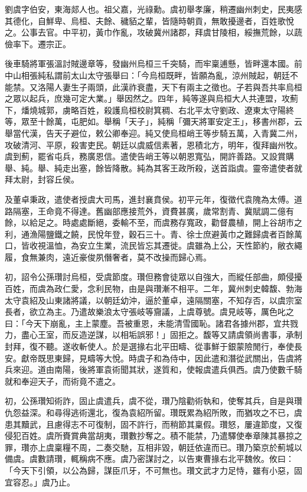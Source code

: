 
\begin{pinyinscope}
劉虞字伯安，東海郯人也。祖父嘉，光祿勳。虞初舉孝廉，稍遷幽州刺史，民夷感其德化，自鮮卑、烏桓、夫餘、穢貊之輩，皆隨時朝貢，無敢擾邊者，百姓歌悅之。公事去官。中平初，黃巾作亂，攻破冀州諸郡，拜虞甘陵相，綏撫荒餘，以蔬儉率下。遷宗正。

後車騎將軍張溫討賊邊章等，發幽州烏桓三千突騎，而牢稟逋懸，皆畔還本國。前中山相張純私謂前太山太守張舉曰：「今烏桓既畔，皆願為亂，涼州賊起，朝廷不能禁。又洛陽人妻生子兩頭，此漢祚衰盡，天下有兩主之徵也。子若與吾共率烏桓之眾以起兵，庶幾可定大業。」舉因然之。四年，純等遂與烏桓大人共連盟，攻薊下，燔燒城郭，虜略百姓，殺護烏桓校尉箕稠、右北平太守劉政、遼東太守陽終等，眾至十餘萬，屯肥如。舉稱「天子」，純稱「彌天將軍安定王」，移書州郡，云舉當代漢，告天子避位，敕公卿奉迎。純又使烏桓峭王等步騎五萬，入青冀二州，攻破清河、平原，殺害吏民。朝廷以虞威信素著，恩積北方，明年，復拜幽州牧。虞到薊，罷省屯兵，務廣恩信。遣使告峭王等以朝恩寬弘，開許善路。又設賞購舉、純。舉、純走出塞，餘皆降散。純為其客王政所殺，送首詣虞。靈帝遣使者就拜太尉，封容丘侯。

及董卓秉政，遣使者授虞大司馬，進封襄賁侯。初平元年，復徵代袁隗為太傅。道路隔塞，王命竟不得達。舊幽部應接荒外，資費甚廣，歲常割青、冀賦調二億有餘，以給足之。時處處斷絕，委輸不至，而虞務存寬政，勸督農植，開上谷胡巿之利，通漁陽鹽鐵之饒，民悅年登，穀石三十。青、徐士庶避黃巾之難歸虞者百餘萬口，皆收視溫恤，為安立生業，流民皆忘其遷徙。虞雖為上公，天性節約，敝衣繩履，食無兼肉，遠近豪俊夙僭奢者，莫不改操而歸心焉。

初，詔令公孫瓚討烏桓，受虞節度。瓚但務會徒眾以自強大，而縱任部曲，頗侵擾百姓，而虞為政仁愛，念利民物，由是與瓚漸不相平。二年，冀州刺史韓馥、勃海太守袁紹及山東諸將議，以朝廷幼沖，逼於董卓，遠隔關塞，不知存否，以虞宗室長者，欲立為主。乃遣故樂浪太守張岐等齎議，上虞尊號。虞見岐等，厲色叱之曰：「今天下崩亂，主上蒙塵。吾被重恩，未能清雪國恥。諸君各據州郡，宜共戮力，盡心王室，而反造逆謀，以相垢誤邪！」固拒之。馥等又請虞領尚書事，承制封拜，復不聽。遂收斬使人。於是選掾右北平田疇、從事鮮于銀蒙險閒行，奉使長安。獻帝既思東歸，見疇等大悅。時虞子和為侍中，因此遣和潛從武關出，告虞將兵來迎。道由南陽，後將軍袁術聞其狀，遂質和，使報虞遣兵俱西。虞乃使數千騎就和奉迎天子，而術竟不遣之。

初，公孫瓚知術詐，固止虞遣兵，虞不從，瓚乃陰勸術執和，使奪其兵，自是與瓚仇怨益深。和尋得逃術還北，復為袁紹所留。瓚既累為紹所敗，而猶攻之不已，虞患其黷武，且慮得志不可復制，固不許行，而稍節其稟假。瓚怒，屢違節度，又復侵犯百姓。虞所賚賞典當胡夷，瓚數抄奪之。積不能禁，乃遣驛使奉章陳其暴掠之罪，瓚亦上虞稟糧不周，二奏交馳，互相非毀，朝廷依違而已。瓚乃築京於薊城以備虞。虞數請瓚，輒稱病不應。虞乃密謀討之，以告東曹掾右北平魏攸。攸曰：「今天下引領，以公為歸，謀臣爪牙，不可無也。瓚文武才力足恃，雖有小惡，固宜容忍。」虞乃止。


\end{pinyinscope}

